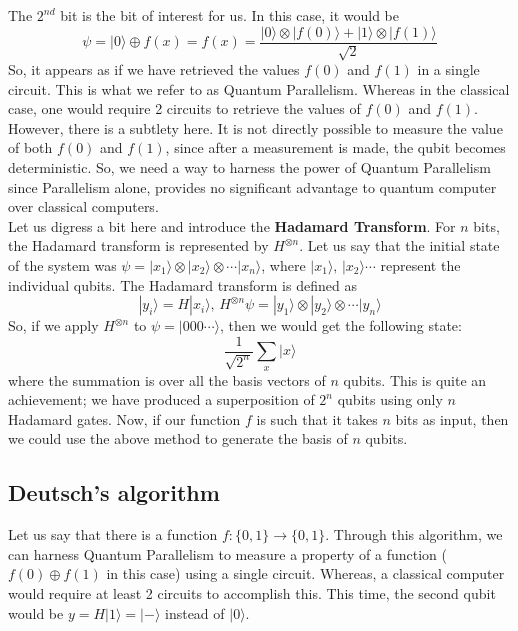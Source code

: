\documentclass{article}
\begin{document}
The $2^{nd}$ bit is the bit of interest for us. In this case, it would be $$\psi = |0 \rangle \oplus f(x) = f(x) = \displaystyle{\frac{|0 \rangle \otimes |f(0) \rangle + |1 \rangle \otimes |f(1) \rangle}{\sqrt{2}}}$$ So, it appears as if we have retrieved the values $f(0)$ and $f(1)$ in a single circuit. This is what we refer to as Quantum Parallelism. Whereas in the classical case, one would require 2 circuits to retrieve the values of $f(0)$ and $f(1)$. However, there is a subtlety here. It is not directly possible to measure the value of both $f(0)$ and $f(1)$, since after a measurement is made, the qubit becomes deterministic. So, we need a way to harness the power of Quantum Parallelism since Parallelism alone, provides no significant advantage to quantum computer over classical computers.  \\[5pt]
Let us digress a bit here and introduce the \textbf{Hadamard Transform}. For $n$ bits, the Hadamard transform is represented by $H^{\otimes n}$. Let us say that the initial state of the system was $\psi = |x_1 \rangle \otimes |x_2 \rangle \otimes \cdots |x_n \rangle$, where $|x_1 \rangle,\, |x_2 \rangle \cdots$ represent the individual qubits. The Hadamard transform is defined as $$|y_i \rangle = H|x_i \rangle ,\, H^{\otimes n} \psi = |y_1 \rangle \otimes |y_2 \rangle \otimes \cdots |y_n \rangle$$
So, if we apply $H^{\otimes n}$ to $\psi = |000 \cdots \rangle$, then we would get the following state:$$\frac{1}{\sqrt{2^n}} \sum_{x} |x \rangle$$
where the summation is over all the basis vectors of $n$ qubits. This is quite an achievement; we have produced a  superposition of $2^n$ qubits using only $n$ Hadamard gates.
Now, if our function $f$ is such that it takes $n$ bits as input, then we could use the above method to generate the basis of $n$ qubits.

\subsection{Deutsch's algorithm}
Let us say that there is a function $f:\{0, 1\} \longrightarrow \{0, 1\}$.
Through this algorithm, we can harness Quantum Parallelism to measure a property of a function ($f(0) \oplus f(1)$ in this case) using a single circuit. Whereas, a classical computer would require at least 2 circuits to accomplish this.
This time, the second qubit would be $y = H|1 \rangle = |- \rangle$ instead of $|0 \rangle$. 
\end{document}
